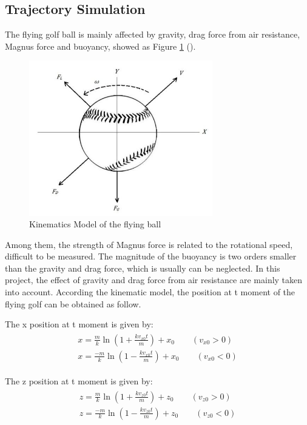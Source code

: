 \subsection{Trajectory Simulation}
The flying golf ball is mainly affected by gravity, drag force from air resistance, Magnus force and buoyancy, showed as Figure \ref{fig:model2} (\cite{martin2012evaluation}). 
\begin{figure}[H]
    \centering
    \includegraphics[width=8cm]{figure/KM.png}
    \caption{Kinematics Model of the flying ball}
    \label{fig:model2}
\end{figure}
Among them, the strength of Magnus force is related to the rotational speed, difficult to be measured. The magnitude of the buoyancy is two orders smaller than the gravity and drag force, which is usually can be neglected. In this project, the effect of gravity and drag force from air resistance are mainly taken into account. According the kinematic model, the position at t moment of the flying golf can be obtained as follow.

The x position at t moment is given by:
\begin{align}
\begin{split}
  x=\frac{m}{k} \ln \left(1+\frac{k v_{x 0} t}{m}\right)+x_{0} \qquad(v_{x 0}>0)\\ 
  x=\frac{-m}{k} \ln \left(1-\frac{k v_{x 0} t}{m}\right)+x_{0} \qquad(v_{x 0}<0)
\end{split}
\end{align}

The z position at t moment is given by:
\begin{align}
\begin{split}
 z=\frac{m}{k} \ln \left(1+\frac{k v_{z 0} t}{m}\right)+z_{0}  \qquad(v_{z 0}>0)\\ 
z=\frac{-m}{k} \ln \left(1-\frac{k v_{z 0} t}{m}\right)+z_{0} \qquad(v_{z 0}<0)
\end{split}
\end{align}


